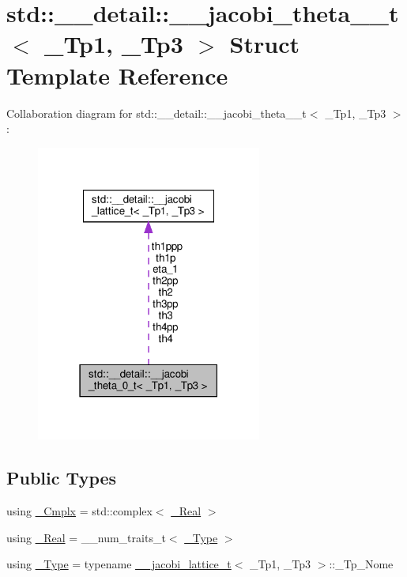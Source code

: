 \hypertarget{structstd_1_1____detail_1_1____jacobi__theta__0__t}{}\section{std\+:\+:\+\_\+\+\_\+detail\+:\+:\+\_\+\+\_\+jacobi\+\_\+theta\+\_\+\_\+t$<$ \+\_\+\+Tp1, \+\_\+\+Tp3 $>$ Struct Template Reference}
\label{structstd_1_1____detail_1_1____jacobi__theta__0__t}


Collaboration diagram for std\+:\+:\+\_\+\+\_\+detail\+:\+:\+\_\+\+\_\+jacobi\+\_\+theta\+\_\+\_\+t$<$ \+\_\+\+Tp1, \+\_\+\+Tp3 $>$\+:
\nopagebreak
\begin{figure}[H]
\begin{center}
\leavevmode
\includegraphics[width=210pt]{structstd_1_1____detail_1_1____jacobi__theta__0__t__coll__graph}
\end{center}
\end{figure}
\subsection*{Public Types}
\begin{DoxyCompactItemize}
\item 
using \hyperlink{structstd_1_1____detail_1_1____jacobi__theta__0__t_abe1df2c4f893fbb7c6fad023115f2fd6}{\+\_\+\+Cmplx} = std\+::complex$<$ \hyperlink{structstd_1_1____detail_1_1____jacobi__theta__0__t_a1828d0b82b76cdf8281b0eabcfcfbaf9}{\+\_\+\+Real} $>$
\item 
using \hyperlink{structstd_1_1____detail_1_1____jacobi__theta__0__t_a1828d0b82b76cdf8281b0eabcfcfbaf9}{\+\_\+\+Real} = \+\_\+\+\_\+num\+\_\+traits\+\_\+t$<$ \hyperlink{structstd_1_1____detail_1_1____jacobi__theta__0__t_a4aebcbdd8f3ab416a2fa770aa3784d63}{\+\_\+\+Type} $>$
\item 
using \hyperlink{structstd_1_1____detail_1_1____jacobi__theta__0__t_a4aebcbdd8f3ab416a2fa770aa3784d63}{\+\_\+\+Type} = typename \hyperlink{structstd_1_1____detail_1_1____jacobi__lattice__t}{\+\_\+\+\_\+jacobi\+\_\+lattice\+\_\+t}$<$ \+\_\+\+Tp1, \+\_\+\+Tp3 $>$\+::\+\_\+\+Tp\+\_\+\+Nome
\end{DoxyCompactItemize}
